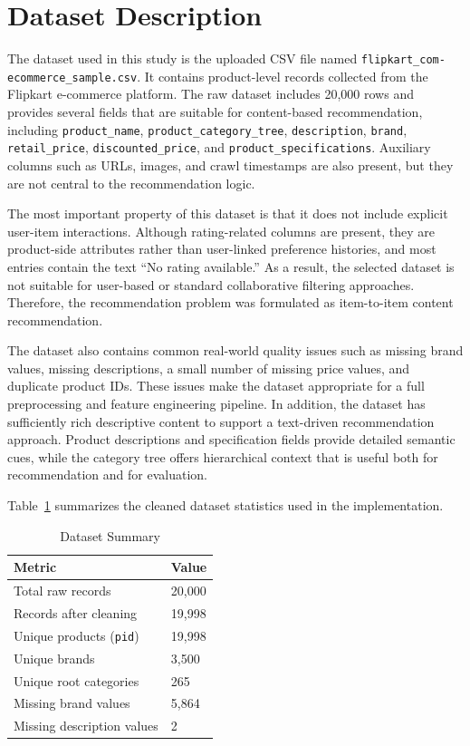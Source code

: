 \documentclass[conference]{IEEEtran}
\begin{document}
\section{Dataset Description}
The dataset used in this study is the uploaded CSV file named \texttt{flipkart\_com-ecommerce\_sample.csv}. It contains product-level records collected from the Flipkart e-commerce platform. The raw dataset includes 20,000 rows and provides several fields that are suitable for content-based recommendation, including \texttt{product\_name}, \texttt{product\_category\_tree}, \texttt{description}, \texttt{brand}, \texttt{retail\_price}, \texttt{discounted\_price}, and \texttt{product\_specifications}. Auxiliary columns such as URLs, images, and crawl timestamps are also present, but they are not central to the recommendation logic.

The most important property of this dataset is that it does not include explicit user-item interactions. Although rating-related columns are present, they are product-side attributes rather than user-linked preference histories, and most entries contain the text ``No rating available.'' As a result, the selected dataset is not suitable for user-based or standard collaborative filtering approaches. Therefore, the recommendation problem was formulated as item-to-item content recommendation.

The dataset also contains common real-world quality issues such as missing brand values, missing descriptions, a small number of missing price values, and duplicate product IDs. These issues make the dataset appropriate for a full preprocessing and feature engineering pipeline. In addition, the dataset has sufficiently rich descriptive content to support a text-driven recommendation approach. Product descriptions and specification fields provide detailed semantic cues, while the category tree offers hierarchical context that is useful both for recommendation and for evaluation.

Table~\ref{tab:dataset_summary} summarizes the cleaned dataset statistics used in the implementation.

\begin{table}[!t]
\caption{Dataset Summary}
\label{tab:dataset_summary}
\centering
\begin{tabular}{|p{}|p{}|}
\hline
\textbf{Metric} & \textbf{Value} \\
\hline
Total raw records & 20,000 \\
\hline
Records after cleaning & 19,998 \\
\hline
Unique products (\texttt{pid}) & 19,998 \\
\hline
Unique brands & 3,500 \\
\hline
Unique root categories & 265 \\
\hline
Missing brand values & 5,864 \\
\hline
Missing description values & 2 \\
\hline
\end{tabular}
\end{table}
\end{document}
